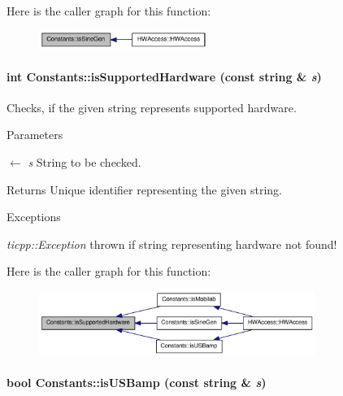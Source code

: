 Here is the caller graph for this function:\nopagebreak
\begin{figure}[H]
\begin{center}
\leavevmode
\includegraphics[width=155pt]{class_constants_a2a0486841708b429d3a9ba6292702dd2_icgraph}
\end{center}
\end{figure}
\hypertarget{class_constants_a4b37b62ba4036999ec78ee665e0fc99f}{
\paragraph[{isSupportedHardware}]{\setlength{\rightskip}{0pt plus 5cm}int Constants::isSupportedHardware (const string \& {\em s})}\hfill}
\label{class_constants_a4b37b62ba4036999ec78ee665e0fc99f}


Checks, if the given string represents supported hardware. 
\begin{DoxyParams}{Parameters}
\item[\mbox{$\leftarrow$} {\em s}]String to be checked. \end{DoxyParams}
\begin{DoxyReturn}{Returns}
Unique identifier representing the given string. 
\end{DoxyReturn}

\begin{DoxyExceptions}{Exceptions}
\item[{\em ticpp::Exception}]thrown if string representing hardware not found! \end{DoxyExceptions}


Here is the caller graph for this function:\nopagebreak
\begin{figure}[H]
\begin{center}
\leavevmode
\includegraphics[width=254pt]{class_constants_a4b37b62ba4036999ec78ee665e0fc99f_icgraph}
\end{center}
\end{figure}
\hypertarget{class_constants_a9783854161bd324f9aa14f66d460b7a5}{
\paragraph[{isUSBamp}]{\setlength{\rightskip}{0pt plus 5cm}bool Constants::isUSBamp (const string \& {\em s})}\hfill}
\label{class_constants_a9783854161bd324f9aa14f66d460b7a5}


